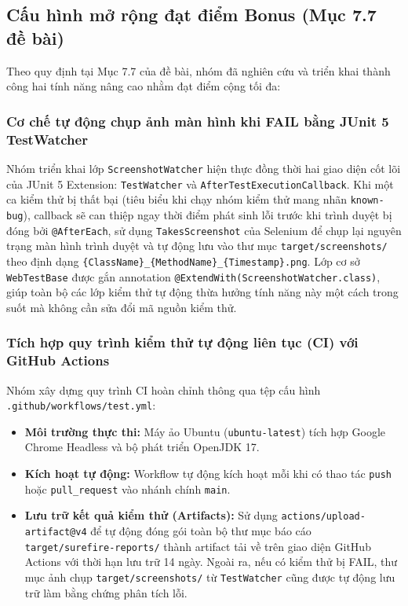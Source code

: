 \documentclass[a4paper]{article}
\begin{document}
\subsection{Cấu hình mở rộng đạt điểm Bonus (Mục 7.7 đề bài)}
Theo quy định tại Mục 7.7 của đề bài, nhóm đã nghiên cứu và triển khai thành công hai tính năng nâng cao nhằm đạt điểm cộng tối đa:

\subsubsection{Cơ chế tự động chụp ảnh màn hình khi FAIL bằng JUnit 5 TestWatcher}
Nhóm triển khai lớp \texttt{ScreenshotWatcher} hiện thực đồng thời hai giao diện cốt lõi của JUnit 5 Extension: \texttt{TestWatcher} và \texttt{AfterTestExecutionCallback}. 
Khi một ca kiểm thử bị thất bại (tiêu biểu khi chạy nhóm kiểm thử mang nhãn \texttt{known-bug}), callback sẽ can thiệp ngay thời điểm phát sinh lỗi trước khi trình duyệt bị đóng bởi \texttt{@AfterEach}, sử dụng \texttt{TakesScreenshot} của Selenium để chụp lại nguyên trạng màn hình trình duyệt và tự động lưu vào thư mục \texttt{target/screenshots/} theo định dạng \texttt{\{ClassName\}\_\{MethodName\}\_\{Timestamp\}.png}.
Lớp cơ sở \texttt{WebTestBase} được gắn annotation \texttt{@ExtendWith(ScreenshotWatcher.class)}, giúp toàn bộ các lớp kiểm thử tự động thừa hưởng tính năng này một cách trong suốt mà không cần sửa đổi mã nguồn kiểm thử.

\subsubsection{Tích hợp quy trình kiểm thử tự động liên tục (CI) với GitHub Actions}
Nhóm xây dựng quy trình CI hoàn chỉnh thông qua tệp cấu hình \texttt{.github/workflows/test.yml}:
\begin{itemize}
  \item \textbf{Môi trường thực thi:} Máy ảo Ubuntu (\texttt{ubuntu-latest}) tích hợp Google Chrome Headless và bộ phát triển OpenJDK 17.
  \item \textbf{Kích hoạt tự động:} Workflow tự động kích hoạt mỗi khi có thao tác \texttt{push} hoặc \texttt{pull\_request} vào nhánh chính \texttt{main}.
  \item \textbf{Lưu trữ kết quả kiểm thử (Artifacts):} Sử dụng \texttt{actions/upload-artifact@v4} để tự động đóng gói toàn bộ thư mục báo cáo \texttt{target/surefire-reports/} thành artifact tải về trên giao diện GitHub Actions với thời hạn lưu trữ 14 ngày. Ngoài ra, nếu có kiểm thử bị FAIL, thư mục ảnh chụp \texttt{target/screenshots/} từ \texttt{TestWatcher} cũng được tự động lưu trữ làm bằng chứng phân tích lỗi.
\end{itemize}
\end{document}
